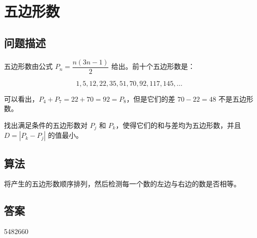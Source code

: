 \section{五边形数}
\subsection{问题描述}
\begin{tcolorbox}
	五边形数由公式 $P_n = \dfrac{n(3n-1)}{2}$ 给出。前十个五边形数是：

	\[
		1, 5, 12, 22, 35, 51, 70, 92, 117, 145, \dots
	\]

	可以看出，$P_4 + P_7 = 22 + 70 = 92 = P_8$，但是它们的差 $70 - 22 = 48$ 不是五边形数。

	找出满足条件的五边形数对 $P_j$ 和 $P_k$，使得它们的和与差均为五边形数，并且 $D = |P_k - P_j|$ 的值最小。
\end{tcolorbox}

\subsection{算法}
将产生的五边形数顺序排列，然后检测每一个数的左边与右边的数是否相等。

\subsection{答案}
5482660
